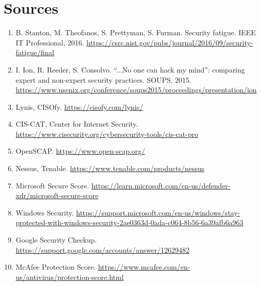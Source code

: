 \documentclass[11pt,a4paper]{article}
\begin{document}
\section*{Sources}
\small
\begin{enumerate}
\item B. Stanton, M. Theofanos, S. Prettyman, S. Furman. Security fatigue. IEEE
  IT Professional, 2016. \url{https://csrc.nist.gov/pubs/journal/2016/09/security-fatigue/final}
\item I. Ion, R. Reeder, S. Consolvo. ``...No one can hack my mind'': comparing
  expert and non-expert security practices. SOUPS, 2015.
  \url{https://www.usenix.org/conference/soups2015/proceedings/presentation/ion}
\item Lynis, CISOfy. \url{https://cisofy.com/lynis/}
\item CIS-CAT, Center for Internet Security. \url{https://www.cisecurity.org/cybersecurity-tools/cis-cat-pro}
\item OpenSCAP. \url{https://www.open-scap.org/}
\item Nessus, Tenable. \url{https://www.tenable.com/products/nessus}
\item Microsoft Secure Score. \url{https://learn.microsoft.com/en-us/defender-xdr/microsoft-secure-score}
\item Windows Security. \url{https://support.microsoft.com/en-us/windows/stay-protected-with-windows-security-2ae0363d-0ada-c064-8b56-6a39afb6a963}
\item Google Security Checkup. \url{https://support.google.com/accounts/answer/12629482}
\item McAfee Protection Score. \url{https://www.mcafee.com/en-us/antivirus/protection-score.html}
\end{enumerate}
\end{document}
